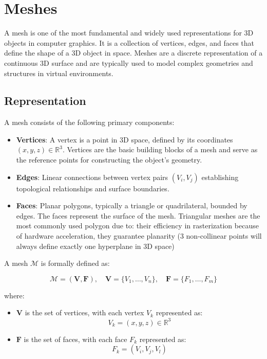 \section{Meshes}

A mesh is one of the most fundamental and widely used representations for 3D objects in computer graphics. It is a collection of vertices, edges, and faces that define the shape of a 3D object in space. Meshes are a discrete representation of a continuous 3D surface and are typically used to model complex geometries and structures in virtual environments.



\subsection{Representation}

A mesh consists of the following primary components:

\begin{itemize}
    \item \textbf{Vertices}: A vertex is a point in 3D space, defined by its coordinates \((x, y, z) \in \mathbb{R}^3\). Vertices are the basic building blocks of a mesh and serve as the reference points for constructing the object’s geometry.
  
    \item \textbf{Edges}: Linear connections between vertex pairs \((V_i, V_j)\) establishing topological relationships and surface boundaries.

    \item \textbf{Faces}: Planar polygons, typically a triangle or quadrilateral, bounded by edges. The faces represent the surface of the mesh. Triangular meshes are the most commonly used polygon due to: their efficiency in rasterization because of hardware acceleration, they guarantee planarity (3 non-collinear points will always define exactly one hyperplane in 3D space)
\end{itemize}

A mesh \( \mathcal{M} \) is formally defined as:

\begin{equation}
\mathcal{M} = (\mathbf{V}, \mathbf{F}), \quad \mathbf{V} = \{ V_1, \dots, V_n \}, \quad \mathbf{F} = \{ F_1, \dots, F_m \}
\end{equation}

where:
\begin{itemize}
    \item \( \mathbf{V} \) is the set of vertices, with each vertex \( V_k \) represented as:
    \begin{equation}
    V_k = (x, y, z) \in \mathbb{R}^3
    \end{equation}
    \item \( \mathbf{F} \) is the set of faces, with each face \( F_k \) represented as:
    \begin{equation}
    F_k = (V_i, V_j, V_l)
    \end{equation}
\end{itemize}

